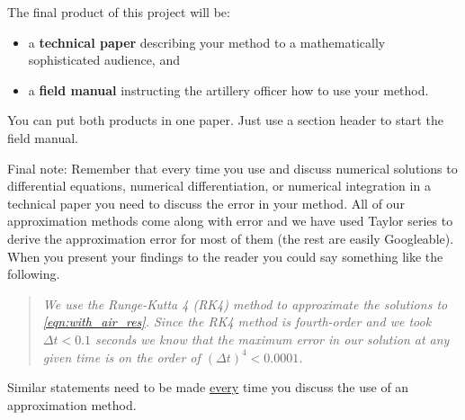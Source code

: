 \noindent The final product of this project will be:
\begin{itemize}
    \item a {\bf technical paper} describing your method to a mathematically sophisticated audience, and
    \item a {\bf field manual} instructing the artillery officer how to use your method.
\end{itemize}
You can put both products in one paper.  Just use a section header to start the field
manual.


Final note: 
Remember that every time you use and discuss numerical solutions to differential
equations, numerical differentiation, or numerical integration in a technical paper you need to discuss the
error in your method.  All of our approximation methods come along with error and we have
used Taylor series to derive the approximation error for most of them (the rest are easily Googleable).  When
you present your findings to the reader you could say something like the following.
\begin{quote}
    {\it We use the Runge-Kutta 4 (RK4) method to approximate the solutions to
    \eqref{eqn:with_air_res}.  Since the RK4 method is fourth-order and we took $\Delta t
    < 0.1$ seconds we know that the maximum error in our solution at any given time is on the order of
$(\Delta t)^4 < 0.0001$.}
\end{quote}
Similar statements need to be made \underline{every} time you discuss the use of an
approximation method.


